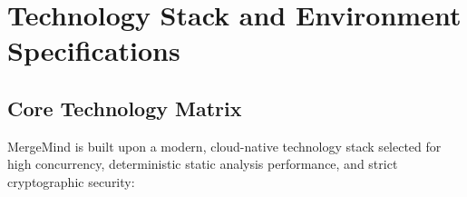 \documentclass[12pt,a4paper,oneside]{report}
\begin{document}
\cleardoublepage




\appendix

\chapter{Technology Stack and Environment Specifications}
\label{app:tech-stack}

\section{Core Technology Matrix}

MergeMind is built upon a modern, cloud-native technology stack selected for high concurrency, deterministic static analysis performance, and strict cryptographic security:
\end{document}
